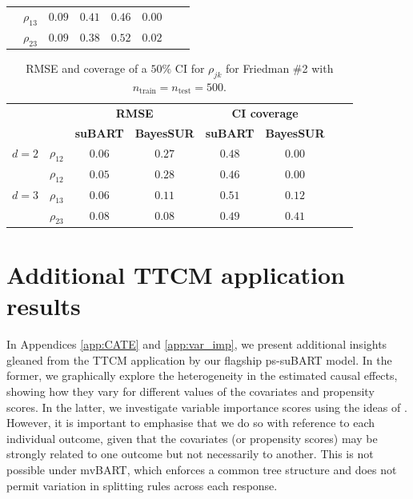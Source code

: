 \documentclass[aoas,preprint]{imsart}
\theoremstyle{plain}
\theoremstyle{definition}
\theoremstyle{remark}
\begin{document}
\begin{appendix}
\begin{table}[H]
\begin{tabular}{llcccccc}
&{$\rho_{13}$} & $0.09$ & $0.41$ & $0.46$ & $0.00$ \\
&{$\rho_{23}$} & $0.09$ & $0.38$ & $0.52$ & $0.02$ \\
\hline
\end{tabular}
\end{table}
\begin{table}[H]
\centering
\caption{RMSE and coverage of a $50\%$ CI for ${\rho}_{jk}$ for Friedman \#2 with $n_{\operatorname{train}} = n_{\operatorname{test}} = 500$.}
\label{tab:sim_corr_class_fried_one_combined_500}
\begin{tabular}{llcccccc}
\hline
\small
& & \multicolumn{2}{c}{\textbf{RMSE}} & \multicolumn{2}{c}{\textbf{CI coverage}} \\
& & \textbf{suBART} & \textbf{BayesSUR} & \textbf{suBART} & \textbf{BayesSUR} \\
\hline
$d=2$&{$\rho_{12}$} & $0.06$ & $0.27$ & $0.48$ & $0.00$ \\ 
\hline
\multirow{3}{*}{$d=3$}&{$\rho_{12}$} & $0.05$ & $0.28$ & $0.46$ & $0.00$ \\
&{$\rho_{13}$} & $0.06$ & $0.11$ & $0.51$ & $0.12$ \\
&{$\rho_{23}$} & $0.08$ & $0.08$ & $0.49$ & $0.41$ \\
\hline
\end{tabular}
\end{table}

\setcounter{figure}{0}
\setcounter{table}{0}
\section{Additional TTCM application results}\label{app:extraTTCM}

In Appendices \ref{app:CATE} and \ref{app:var_imp}, we present additional insights gleaned from the TTCM application by our flagship ps-suBART model. In the former, we graphically explore the heterogeneity in the estimated causal effects, showing how they vary for different values of the covariates and propensity scores. In the latter, we investigate variable importance scores using the ideas of \citet{chipman2010bart}. However, it is important to emphasise that we do so with reference to each individual outcome, given that the covariates (or propensity scores) may be strongly related to one outcome but not necessarily to another. This is not possible under mvBART, which enforces a common tree structure and does not permit variation in splitting rules across each response.


\end{appendix}
\end{document}
